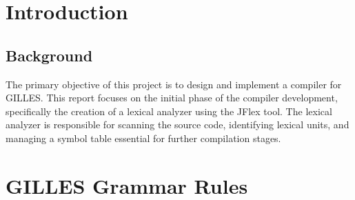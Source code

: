 \documentclass{article}
\begin{document}
	\section{Introduction}
	\subsection{Background}
	The primary objective of this project is to design and implement a compiler for GILLES. This report focuses on the initial phase of the compiler development, specifically the creation of a lexical analyzer using the JFlex tool. The lexical analyzer is responsible for scanning the source code, identifying lexical units, and managing a symbol table essential for further compilation stages.

	\section{GILLES Grammar Rules}
\end{document}
